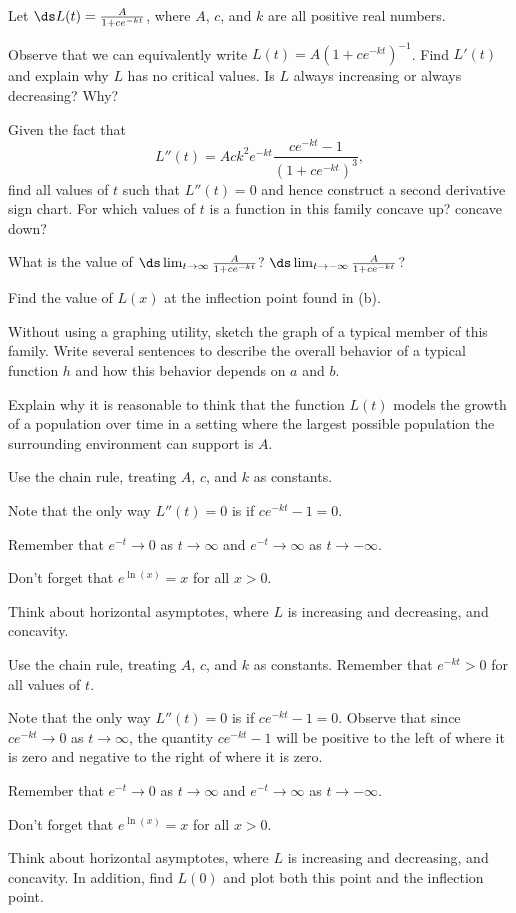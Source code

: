\begin{activity} \label{A:3.2.3} 
 Let $\ds L(t) = \frac{A}{1+ce^{-kt}}$, where $A$, $c$, and $k$ are all positive real numbers.
	 \ba
		\item Observe that we can equivalently write $L(t) = A(1+ce^{-kt})^{-1}$.  Find $L'(t)$ and explain why $L$ has no critical values.  Is $L$ always increasing or always decreasing?  Why?
	 	\item Given the fact that
		$$L''(t) = Ack^2e^{-kt} \frac{ce^{-kt}-1}{(1+ce^{-kt})^3},$$
		find all values of $t$ such that $L''(t) = 0$ and hence construct a second derivative sign chart.  For which values of $t$ is a function in this family concave up?  concave down?
		\item What is the value of $\ds \lim_{t \to \infty} \frac{A}{1+ce^{-kt}}$? $\ds \lim_{t \to -\infty} \frac{A}{1+ce^{-kt}}$?
		\item Find the value of $L(x)$ at the inflection point found in (b).
	  	\item Without using a graphing utility, sketch the graph of a typical member of this family. Write several sentences to describe the overall behavior of a typical function $h$ and how this behavior depends on $a$ and $b$.
		\item Explain why it is reasonable to think that the function $L(t)$ models the growth of a population over time in a setting where the largest possible population the surrounding environment can support is $A$.
	 \ea
\end{activity}
\begin{smallhint}
	 \ba
		\item Use the chain rule, treating $A$, $c$, and $k$ as constants.
	 	\item Note that the only way $L''(t) = 0$ is if $ce^{-kt}-1 = 0$.
		\item Remember that $e^{-t} \to 0$ as $t \to \infty$ and $e^{-t} \to \infty$ as $t \to -\infty$.
		\item Don't forget that $e^{\ln(x)} = x$ for all $x > 0$.
	  	\item Think about horizontal asymptotes, where $L$ is increasing and decreasing, and concavity.
	 \ea
\end{smallhint}
\begin{bighint}
	 \ba
		\item Use the chain rule, treating $A$, $c$, and $k$ as constants.  Remember that $e^{-kt} > 0$ for all values of $t$.
	 	\item Note that the only way $L''(t) = 0$ is if $ce^{-kt}-1 = 0$.  Observe that since $ce^{-kt} \to 0$ as $t \to \infty$, the quantity $ce^{-kt} - 1$ will be positive to the left of where it is zero and negative to the right of where it is zero.
		\item Remember that $e^{-t} \to 0$ as $t \to \infty$ and $e^{-t} \to \infty$ as $t \to -\infty$.
		\item Don't forget that $e^{\ln(x)} = x$ for all $x > 0$.
	  	\item Think about horizontal asymptotes, where $L$ is increasing and decreasing, and concavity.  In addition, find $L(0)$ and plot both this point and the inflection point.
	 \ea
\end{bighint}
